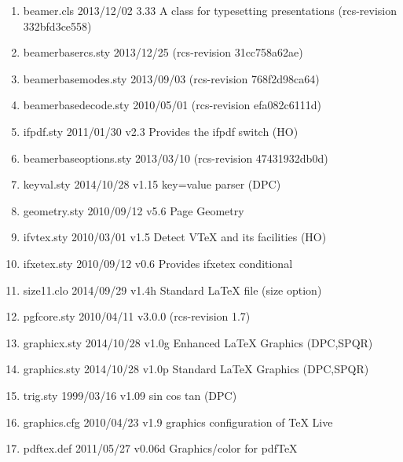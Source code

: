 		\begin{enumerate}
\item 	 beamer.cls 2013/12/02 3.33 A class for typesetting presentations (rcs-revision 332bfd3ce558)
\item 	beamerbasercs.sty 2013/12/25 (rcs-revision 31cc758a62ae)
\item 	beamerbasemodes.sty 2013/09/03 (rcs-revision 768f2d98ca64)
\item 	beamerbasedecode.sty 2010/05/01 (rcs-revision efa082c6111d)
\item 		 ifpdf.sty 2011/01/30 v2.3 Provides the ifpdf switch (HO)
\item 		 beamerbaseoptions.sty 2013/03/10 (rcs-revision 47431932db0d)
\item keyval.sty 2014/10/28 v1.15 key=value parser (DPC)
\item geometry.sty 2010/09/12 v5.6 Page Geometry
\item ifvtex.sty 2010/03/01 v1.5 Detect VTeX and its facilities (HO)
\item ifxetex.sty 2010/09/12 v0.6 Provides ifxetex conditional
\item size11.clo 2014/09/29 v1.4h Standard LaTeX file (size option)
\item pgfcore.sty 2010/04/11 v3.0.0 (rcs-revision 1.7)
\item graphicx.sty 2014/10/28 v1.0g Enhanced LaTeX Graphics (DPC,SPQR)
\item graphics.sty 2014/10/28 v1.0p Standard LaTeX Graphics (DPC,SPQR)
\item trig.sty 1999/03/16 v1.09 sin cos tan (DPC)
\item graphics.cfg 2010/04/23 v1.9 graphics configuration of TeX Live
\item pdftex.def 2011/05/27 v0.06d Graphics/color for pdfTeX

\end{enumerate}
